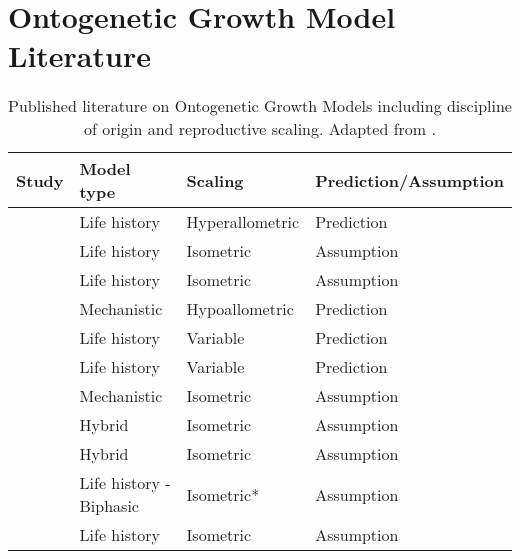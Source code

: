 \documentclass[a4paper]{article} %
\begin{document}
\newpage
\section{Ontogenetic Growth Model Literature}

\begin{table}[H]
    \caption{Published literature on Ontogenetic Growth Models including discipline of origin and reproductive scaling. Adapted from \textcite{Barneche2018-reproductive_output}.}
    \begin{tabular}{|l|l|l|l|}
    \hline
    \textbf{Study}                      & \textbf{Model type}       & \textbf{Scaling} & \textbf{Prediction/Assumption} \\ \hline
    \textcite{Gadgil1970}                   & Life history              & Hyperallometric  & Prediction                     \\ \hline
    \textcite{Roff1983}                     & Life history              & Isometric        & Assumption                     \\ \hline
    \textcite{Roff1984}                     & Life history              & Isometric        & Assumption                     \\ \hline
    \textcite{Reiss1985}                    & Mechanistic               & Hypoallometric   & Prediction                     \\ \hline
    \textcite{Kozowski1987-indeterminate}   & Life history              & Variable         & Prediction                     \\ \hline
    \textcite{kozlowski1996}                & Life history              & Variable         & Prediction                     \\ \hline
    \textcite{West2001}                     & Mechanistic               & Isometric        & Assumption                     \\ \hline
    \textcite{Charnov2001}                  & Hybrid                    & Isometric        & Assumption                     \\ \hline
    \textcite{Charnov2002}                  & Hybrid                    & Isometric        & Assumption                     \\ \hline
    \textcite{Lester2004}                   & Life history - Biphasic   & Isometric*       & Assumption                     \\ \hline
    \textcite{Roff2006}                     & Life history              & Isometric        & Assumption                     \\ \hline

\end{tabular}
\end{table}
\end{document}
